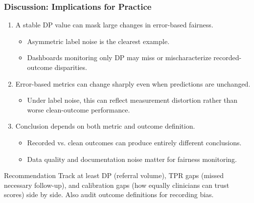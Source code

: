 \documentclass{beamer}
\begin{document}
\begin{frame}
\frametitle{Discussion: Implications for Practice}

\begin{enumerate}
    \item \alert{A stable DP value can mask large changes in error-based fairness.}
    \begin{itemize}
        \item Asymmetric label noise is the clearest example.
        \item Dashboards monitoring only DP may miss or mischaracterize recorded-outcome disparities.
    \end{itemize}
    
    \item \alert{Error-based metrics can change sharply even when predictions are unchanged.}
    \begin{itemize}
        \item Under label noise, this can reflect measurement distortion rather than worse clean-outcome performance.
    \end{itemize}
    
    \item \alert{Conclusion depends on both metric and outcome definition.}
    \begin{itemize}
        \item Recorded vs. clean outcomes can produce entirely different conclusions.
        \item Data quality and documentation noise matter for fairness monitoring.
    \end{itemize}
\end{enumerate}

\begin{block}{Recommendation}
\small
  Track at least DP (referral volume), TPR gaps (missed necessary follow-up), 
  and calibration gaps (how equally clinicians can trust scores) side by side.
  Also audit outcome definitions for recording bias.
\end{block}

\end{frame}
\end{document}
